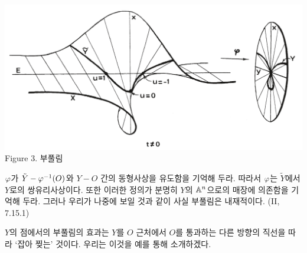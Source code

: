 	
	\begin{center}
	\includegraphics[width=0.8\columnwidth]{Figure3}\\
	Figure 3. 부풀림
	\end{center}
	
	
	\begin{definition}
	\end{definition}
	
	$\varphi$가 $\tilde Y-\varphi^{-1}(O)$와 $Y-O$ 간의 동형사상을 유도함을 기억해 두라.
	따라서 $\varphi$는 $\tilde Y$에서 $Y$로의 쌍유리사상이다.
	또한 이러한 정의가 분명히 $Y$의 $\mathbb{A}^n$으로의 매장에 의존함을 기억해 두라.
	그러나 우리가 나중에 보일 것과 같이 사실 부풀림은 내재적이다. (II, 7.15.1)
	
	$Y$의 점에서의 부풀림의 효과는 $Y$를 $O$ 근처에서 $O$를 통과하는 다른 방향의 직선을 따라 `잡아 찢는' 것이다.
	우리는 이것을 예를 통해 소개하겠다.
	
